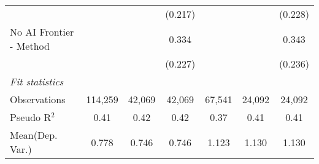 \begin{tabular}{lcccccc}
                           &         &         & (0.217) &         &         & (0.228)\\   
   No AI Frontier - Method &         &         & 0.334   &         &         & 0.343\\   
                           &         &         & (0.227) &         &         & (0.236)\\   
   \midrule
   \emph{Fit statistics}\\
   Observations            & 114,259 & 42,069  & 42,069  & 67,541  & 24,092  & 24,092\\  
   Pseudo R$^2$            & 0.41    & 0.42    & 0.42    & 0.37    & 0.41    & 0.41\\  
Mean(Dep. Var.) & 0.778 & 0.746 & 0.746 & 1.123 & 1.130 & 1.130 \\
   

\end{tabular}
